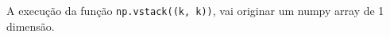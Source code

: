 \documentclass[12pt,varwidth=16cm,border=1pt]{standalone}
\begin{document}
A execução da função \verb+np.vstack((k, k))+, vai originar um numpy array de 1 dimensão.

\questiomfalse
\end{document}

